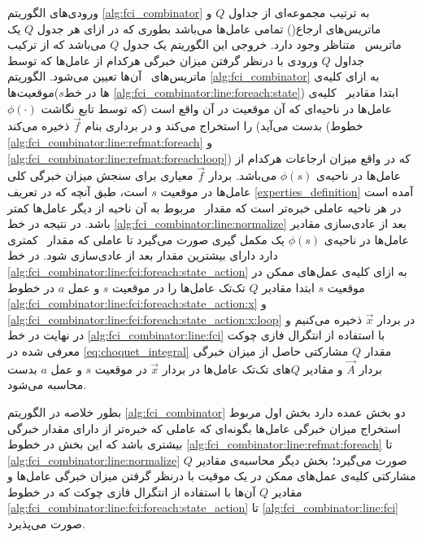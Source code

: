 ورودی‌های الگوریتم
\ref{alg:fci_combinator}
به ترتیب مجموعه‌ای از جداول $Q$ و ماتریس‌های ارجاع() تمامی عامل‌ها می‌باشد بطوری که در ازای هر جدول $Q$ یک ماتریس \ متناظر وجود دارد. خروجی این الگوریتم یک جدول $Q$ می‌باشد که از ترکیب جداول $Q$ ورودی با درنظر گرفتن میزان خبرگی هرکدام از عامل‌ها که توسط ماتریس‌های \ آن‌ها تعیین می‌شود. الگوریتم
\ref{alg:fci_combinator}
به ازای کلیه‌ی موقعیت‌ها($s$ها در خط \ref{alg:fci_combinator:line:foreach:state}) ابتدا مقادیر \ کلیه‌ی عامل‌ها در ناحیه‌ای که آن موقعیت در آن واقع است (که توسط تابع نگاشت $\phi(\cdot)$ بدست می‌آید) را استخراج می‌کند و در برداری بنام $\vec{f}$ ذخیره می‌کند (خطوط \ref{alg:fci_combinator:line:refmat:foreach} و \ref{alg:fci_combinator:line:refmat:foreach:loop}) که در واقع میزان ارجاعات هرکدام از عامل‌ها در ناحیه‌ی $\phi(s)$ می‌باشد. بردار $\vec{f}$ معیاری برای سنجش میزان خبرگی کلی عامل‌ها در موقعیت $s$ است، طبق آنچه که در تعریف
\ref{experties_definition}
آمده است در هر ناحیه‌ عاملی خبره‌تر است که مقدار \ مربوط به آن ناحیه از دیگر عامل‌ها کمتر باشد. در نتیجه در خط \ref{alg:fci_combinator:line:normalize} بعد از عادی‌سازی مقادیر \ عامل‌ها در ناحیه‌ی $\phi(s)$ یک مکمل‌ گیری صورت می‌گیرد تا عاملی که مقدار \ کمتری دارد دارای بیشترین مقدار بعد از عادی‌سازی شود. در خط \ref{alg:fci_combinator:line:fci:foreach:state_action} به ازای کلیه‌ی عمل‌های ممکن در موقعیت $s$ ابتدا مقادیر $Q$ تک‌تک عامل‌ها را در موقعیت $s$ و عمل $a$ در خطوط \ref{alg:fci_combinator:line:fci:foreach:state_action:x} و \ref{alg:fci_combinator:line:fci:foreach:state_action:x:loop} در بردار $\vec{x}$ ذخیره می‌کنیم و در نهایت در خط \ref{alg:fci_combinator:line:fci} با استفاده از انتگرال فازی چوکت معرفی شده در \ref{eq:choquet_integral} مقدار $Q$ مشارکتی حاصل از میزان خبرگی بردار $\vec{A}$ و مقادیر $Q$‌های تک‌تک عامل‌ها در بردار $\vec{x}$ در موقعیت $s$ و عمل $a$ بدست محاسبه می‌شود.

بطور خلاصه در الگوریتم \ref{alg:fci_combinator} دو بخش عمده دارد بخش اول مربوط استخراج میزان خبرگی عامل‌ها بگونه‌ای که عاملی که خبره‌تر از دارای مقدار خبرگی بیشتری باشد که این بخش در خطوط \ref{alg:fci_combinator:line:refmat:foreach} تا \ref{alg:fci_combinator:line:normalize} صورت می‌گیرد؛ بخش دیگر محاسبه‌ی مقادیر $Q$ مشارکتی کلیه‌ی عمل‌های ممکن در یک موقیت با درنظر گرفتن میزان خبرگی عامل‌ها و مقادیر $Q$ آن‌ها با استفاده از انتگرال فازی چوکت که در خطوط \ref{alg:fci_combinator:line:fci:foreach:state_action} تا \ref{alg:fci_combinator:line:fci} صورت می‌پذیرد.

